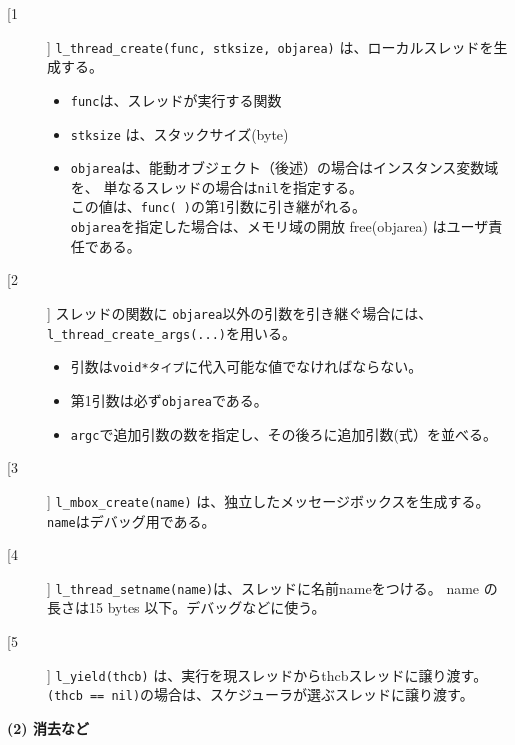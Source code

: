 \begin{description}
\item[[1]]
  \verb|l_thread_create(func, stksize, objarea)| は、ローカルスレッドを生成する。
\begin{itemize}
 \item  \verb|func|は、スレッドが実行する関数
 \item  \verb|stksize| は、スタックサイズ(byte)
 \item  \verb|objarea|は、能動オブジェクト（後述）の場合はインスタンス変数域を、
       単なるスレッドの場合は\verb|nil|を指定する。\\
       この値は、\verb|func( )|の第1引数に引き継がれる。\\
     \verb|objarea|を指定した場合は、メモリ域の開放 free(objarea) はユーザ責任である。
\end{itemize}

\item[[2]]
  スレッドの関数に \verb|objarea|以外の引数を引き継ぐ場合には、
  \verb|l_thread_create_args(...)|を用いる。
  \begin{itemize}
  \item 引数は\verb|void*タイプ|に代入可能な値でなければならない。
  \item 第1引数は必ず\verb|objarea|である。
  \item  \verb|argc|で追加引数の数を指定し、その後ろに追加引数(式）を並べる。
  \end{itemize}

\item[[3]]
  \verb|l_mbox_create(name)| は、独立したメッセージボックスを生成する。
  \verb|name|はデバッグ用である。

\item[[4]]
  \verb|l_thread_setname(name)|は、スレッドに名前nameをつける。
  name の長さは15 bytes 以下。デバッグなどに使う。

\item[[5]]
   \verb|l_yield(thcb)| は、実行を現スレッドからthcbスレッドに譲り渡す。
   \verb|(thcb == nil)|の場合は、スケジューラが選ぶスレッドに譲り渡す。
\end{description}


{\flushleft\bf (2) 消去など}

